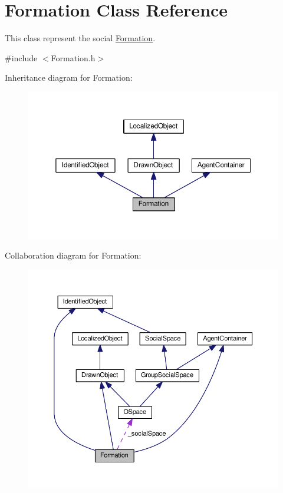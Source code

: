 \hypertarget{classFormation}{}\section{Formation Class Reference}
\label{classFormation}


This class represent the social \hyperlink{classFormation}{Formation}.  




{\ttfamily \#include $<$Formation.\+h$>$}



Inheritance diagram for Formation\+:\nopagebreak
\begin{figure}[H]
\begin{center}
\leavevmode
\includegraphics[width=350pt]{classFormation__inherit__graph}
\end{center}
\end{figure}


Collaboration diagram for Formation\+:\nopagebreak
\begin{figure}[H]
\begin{center}
\leavevmode
\includegraphics[width=350pt]{classFormation__coll__graph}
\end{center}
\end{figure}
